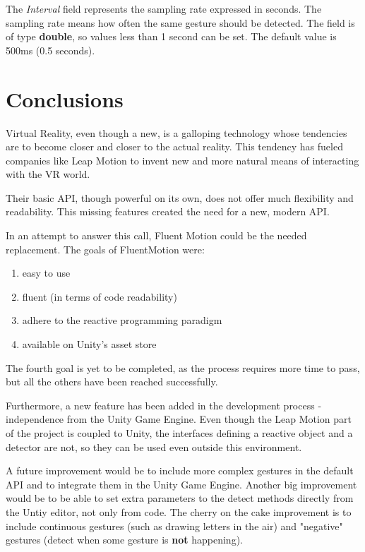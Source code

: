 \documentclass[12pt,a4paper,twoside]{report}
\begin{document}
The \textit{Interval} field represents the sampling rate expressed in seconds. The sampling rate means how often the same gesture should be detected. The field is of type \textbf{double}, so values less than 1 second can be set. The default value is 500ms (0.5 seconds).

\chapter{Conclusions}

Virtual Reality, even though a new, is a galloping technology whose tendencies are to become closer and closer to the actual reality. This tendency has fueled companies like Leap Motion to invent new and more natural means of interacting with the VR world.

Their basic API, though powerful on its own, does not offer much flexibility and readability. This missing features created the need for a new, modern API.

In an attempt to answer this call, Fluent Motion could be the needed replacement. The goals of FluentMotion were:

\begin{enumerate}
  \item easy to use
  \item fluent (in terms of code readability)
  \item adhere to the reactive programming paradigm
  \item available on Unity's asset store
\end{enumerate}

The fourth goal is yet to be completed, as the process requires more time to pass, but all the others have been reached successfully.

Furthermore, a new feature has been added in the development process - independence from the Unity Game Engine. Even though the Leap Motion part of the project is coupled to Unity, the interfaces defining a reactive object and a detector are not, so they can be used even outside this environment.

A future improvement would be to include more complex gestures in the default API and to integrate them in the Unity Game Engine. Another big improvement would be to be able to set extra parameters to the detect methods directly from the Untiy editor, not only from code. The cherry on the cake improvement is to include continuous gestures (such as drawing letters in the air) and "negative" gestures (detect when some gesture is \textbf{not} happening).

 
\end{document}
